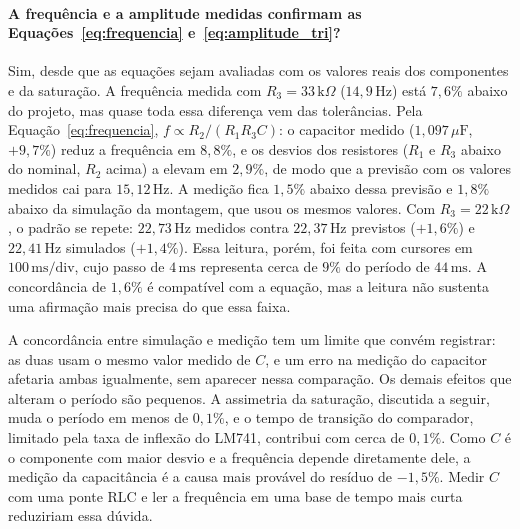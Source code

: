 \documentclass[11pt,a4paper]{article}
\begin{document}
\paragraph{A frequência e a amplitude medidas confirmam as Equações~\ref{eq:frequencia} e~\ref{eq:amplitude_tri}?}

Sim, desde que as equações sejam avaliadas com os valores reais dos componentes e da saturação. A frequência medida com $R_3 = 33\,\text{k}\Omega$ ($14{,}9\,\text{Hz}$) está $7{,}6\%$ abaixo do projeto, mas quase toda essa diferença vem das tolerâncias. Pela Equação~\ref{eq:frequencia}, $f \propto R_2/(R_1R_3C)$: o capacitor medido ($1{,}097\,\mu\text{F}$, $+9{,}7\%$) reduz a frequência em $8{,}8\%$, e os desvios dos resistores ($R_1$ e $R_3$ abaixo do nominal, $R_2$ acima) a elevam em $2{,}9\%$, de modo que a previsão com os valores medidos cai para $15{,}12\,\text{Hz}$. A medição fica $1{,}5\%$ abaixo dessa previsão e $1{,}8\%$ abaixo da simulação da montagem, que usou os mesmos valores. Com $R_3 = 22\,\text{k}\Omega$, o padrão se repete: $22{,}73\,\text{Hz}$ medidos contra $22{,}37\,\text{Hz}$ previstos ($+1{,}6\%$) e $22{,}41\,\text{Hz}$ simulados ($+1{,}4\%$). Essa leitura, porém, foi feita com cursores em $100\,\text{ms/div}$, cujo passo de $4\,\text{ms}$ representa cerca de $9\%$ do período de $44\,\text{ms}$. A concordância de $1{,}6\%$ é compatível com a equação, mas a leitura não sustenta uma afirmação mais precisa do que essa faixa.

A concordância entre simulação e medição tem um limite que convém registrar: as duas usam o mesmo valor medido de $C$, e um erro na medição do capacitor afetaria ambas igualmente, sem aparecer nessa comparação. Os demais efeitos que alteram o período são pequenos. A assimetria da saturação, discutida a seguir, muda o período em menos de $0{,}1\%$, e o tempo de transição do comparador, limitado pela taxa de inflexão do LM741, contribui com cerca de $0{,}1\%$. Como $C$ é o componente com maior desvio e a frequência depende diretamente dele, a medição da capacitância é a causa mais provável do resíduo de $-1{,}5\%$. Medir $C$ com uma ponte RLC e ler a frequência em uma base de tempo mais curta reduziriam essa dúvida.
\end{document}
